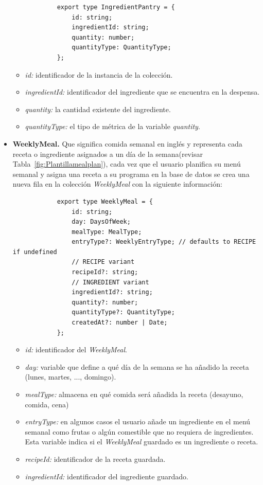 \documentclass[12pt,a4paper]{report} %
\begin{document}
\begin{itemize}
		\begin{lstlisting}
			export type IngredientPantry = {
				id: string;
				ingredientId: string;
				quantity: number;
				quantityType: QuantityType;
			};
		\end{lstlisting}
		\begin{itemize}
			\item \textit{id:} identificador de la instancia de la colección.
			\item \textit{ingredientId:} identificador del ingrediente que se encuentra en la despensa.
			\item \textit{quantity:} la cantidad existente del ingrediente.
			\item \textit{quantityType:} el tipo de métrica de la variable \textit{quantity}.
		\end{itemize}
		\item \textbf{WeeklyMeal.} Que significa comida semanal en inglés y representa cada receta o ingrediente asignados a un día de la semana(revisar Tabla~\ref{fig:Plantillamealplan}), cada vez que el usuario planifica su menú semanal y asigna una receta a su programa en la base de datos se crea una nueva fila en la colección \textit{WeeklyMeal} con la siguiente información:
		\begin{lstlisting}
			export type WeeklyMeal = {
				id: string;
				day: DaysOfWeek;
				mealType: MealType;
				entryType?: WeeklyEntryType; // defaults to RECIPE if undefined
				// RECIPE variant
				recipeId?: string;
				// INGREDIENT variant
				ingredientId?: string;
				quantity?: number;
				quantityType?: QuantityType;
				createdAt?: number | Date;
			};
		\end{lstlisting}
		\begin{itemize}
			\item \textit{id:} identificador del \textit{WeeklyMeal}.
			\item \textit{day:} variable que define a qué día de la semana se ha añadido la receta (lunes, martes, ..., domingo).
			\item \textit{mealType:} almacena en qué comida será añadida la receta (desayuno, comida, cena)
			\item \textit{entryType:} en algunos casos el usuario añade un ingrediente en el menú semanal como frutas o algún comestible que no requiera de ingredientes. Esta variable indica si el \textit{WeeklyMeal} guardado es un ingrediente o receta.
			\item \textit{recipeId:} identificador de la receta guardada.
			\item \textit{ingredientId:} identificador del ingrediente guardado.

\end{itemize}
\end{itemize}
\end{document}

